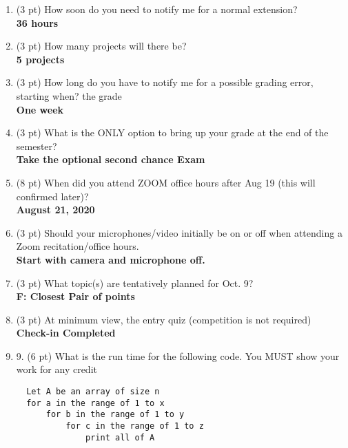 \documentclass[10pt, a4paper]{article}
\begin{document}
\begin{enumerate}

  \item (3 pt) How soon do you need to notify me for a normal extension? \\
    \textbf{36 hours}

  \item (3 pt) How many projects will there be? \\
    \textbf{5 projects}

  \item (3 pt) How long do you have to notify me for a possible grading error, starting when? the grade \\
    \textbf{One week}

  \item (3 pt) What is the ONLY option to bring up your grade at the end of the semester? \\
    \textbf{Take the optional second chance Exam}

  \item (8 pt) When did you attend ZOOM office hours after Aug 19 (this will confirmed later)? \\
    \textbf{August 21, 2020  }

  \item (3 pt) Should your microphones/video initially be on or off when attending a Zoom recitation/office hours. \\
    \textbf{Start with camera and microphone off.}

  \item (3 pt) What topic(s) are tentatively planned for Oct. 9? \\
    \textbf{F: Closest Pair of points}

  \item (3 pt) At minimum view, the entry quiz (competition is not required) \\
    \textbf{Check-in Completed}

  \item 9. (6 pt) What is the run time for the following code. You MUST show your work for any credit \\ 

  \begin{lstlisting}
  Let A be an array of size n
  for a in the range of 1 to x
      for b in the range of 1 to y
          for c in the range of 1 to z
              print all of A


\end{lstlisting}
\end{enumerate}
\end{document}

